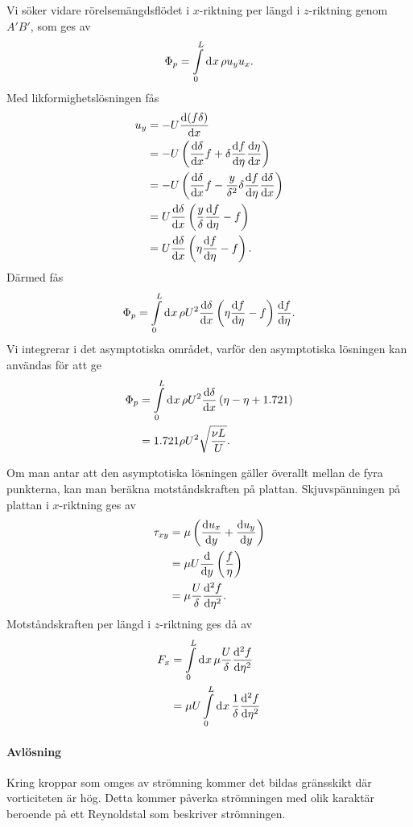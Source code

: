 Vi söker vidare rörelsemängdsflödet i $x$-riktning per längd i $z$-riktning genom $A'B'$, som ges av
\begin{align*}
	\Phi_{p} = \int\limits_{0}^{L}\dd[]{x}\rho u_{y}u_{x}.
\end{align*}
Med likformighetslösningen fås
\begin{align*}
	u_{y} &= -U\dv{(f\delta)}{x} \\
	      &= -U\left(\dv{\delta}{x}f + \delta\dv{f}{\eta}\dv{\eta}{x}\right) \\
	      &= -U\left(\dv{\delta}{x}f - \frac{y}{\delta^{2}}\delta\dv{f}{\eta}\dv{\delta}{x}\right) \\
	      &= U\dv{\delta}{x}\left(\frac{y}{\delta}\dv{f}{\eta} - f\right) \\
	      &= U\dv{\delta}{x}\left(\eta\dv{f}{\eta} - f\right).
\end{align*}
Därmed fås
\begin{align*}
	\Phi_{p} = \int\limits_{0}^{L}\dd[]{x}\rho U^{2}\dv{\delta}{x}\left(\eta\dv{f}{\eta} - f\right)\dv{f}{\eta}.
\end{align*}
Vi integrerar i det asymptotiska området, varför den asymptotiska lösningen kan användas för att ge
\begin{align*}
	\Phi_{p} &= \int\limits_{0}^{L}\dd[]{x}\rho U^{2}\dv{\delta}{x}\left(\eta - \eta + 1.721\right) \\
	         &= 1.721\rho U^{2}\sqrt{\frac{\nu L}{U}}.
\end{align*}

Om man antar att den asymptotiska lösningen gäller överallt mellan de fyra punkterna, kan man beräkna motståndskraften på plattan. Skjuvspänningen på plattan i $x$-riktning ges av
\begin{align*}
	\tau_{xy} &= \mu\left(\dv{u_{x}}{y} + \dv{u_{y}}{y}\right) \\
	          &= \mu U\dv{y}\left(\frac{f}{\eta}\right) \\
	          &= \mu\frac{U}{\delta}\dv[2]{f}{\eta}.
\end{align*}
Motståndskraften per längd i $z$-riktning ges då av
\begin{align*}
	F_{x} &= \int\limits_{0}^{L}\dd[]{x}\mu\frac{U}{\delta}\dv[2]{f}{\eta} \\
	      &= \mu U\int\limits_{0}^{L}\dd[]{x}\frac{1}{\delta}\dv[2]{f}{\eta}
\end{align*}

\paragraph{Avlösning}
Kring kroppar som omges av strömning kommer det bildas gränsskikt där vorticiteten är hög. Detta kommer påverka strömningen med olik karaktär beroende på ett Reynoldstal som beskriver strömningen.

